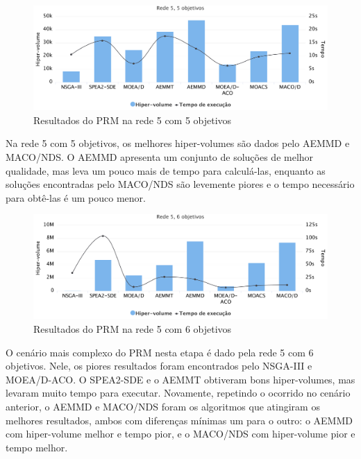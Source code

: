 \begin{figure}[!htbp]
	\caption{Resultados do PRM na rede 5 com 5 objetivos}
	\label{fig_exp4_r5o5}
	\includegraphics[width=1\textwidth]{cap_experimentos/figs/etapa4/r5o5}
\end{figure}

Na rede 5 com 5 objetivos, os melhores hiper-volumes são dados pelo AEMMD e MACO/NDS. O AEMMD apresenta um conjunto de soluções de melhor qualidade, mas leva um pouco mais de tempo para calculá-las, enquanto as soluções encontradas pelo MACO/NDS são levemente piores e o tempo necessário para obtê-las é um pouco menor.

\begin{figure}[!htbp]
	\caption{Resultados do PRM na rede 5 com 6 objetivos}
	\label{fig_exp4_r5o6}
	\includegraphics[width=1\textwidth]{cap_experimentos/figs/etapa4/r5o6}
\end{figure}

O cenário mais complexo do PRM nesta etapa é dado pela rede 5 com 6 objetivos. Nele, os piores resultados foram encontrados pelo NSGA-III e MOEA/D-ACO. O SPEA2-SDE e o AEMMT obtiveram bons hiper-volumes, mas levaram muito tempo para executar. Novamente, repetindo o ocorrido no cenário anterior, o AEMMD e MACO/NDS foram os algoritmos que atingiram os melhores resultados, ambos com diferenças mínimas um para o outro: o AEMMD com hiper-volume melhor e tempo pior, e o MACO/NDS com hiper-volume pior e tempo melhor.

